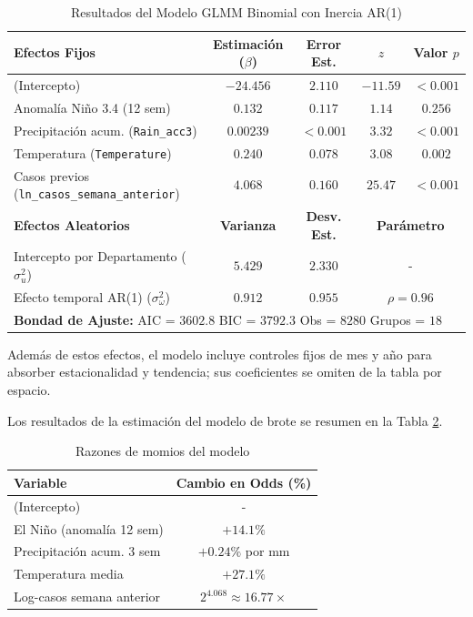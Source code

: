 \documentclass[11pt,a4paper]{article}
\begin{document}
\begin{table}[htbp]
	\centering
	\small
	\caption{Resultados del Modelo GLMM Binomial con Inercia AR(1)}
	\label{tab:modelo_completo}
	\begin{tabular}{lcccc}
		\toprule
		\textbf{Efectos Fijos} & \textbf{Estimación ($\beta$)} & \textbf{Error Est.} & \textbf{$z$} & \textbf{Valor $p$} \\
		\midrule
		(Intercepto)                        & $-24.456$ & $2.110$  & $-11.59$ & $< 0.001$ \\
		Anomalía Niño 3.4 (12 sem)          & $0.132$   & $0.117$  & $1.14$   & $0.256$   \\
		Precipitación acum. (\texttt{Rain\_acc3}) & $0.00239$ & $<0.001$ & $3.32$   & $< 0.001$ \\
		Temperatura (\texttt{Temperature})  & $0.240$   & $0.078$  & $3.08$   & $0.002$   \\
		Casos previos (\texttt{ln\_casos\_semana\_anterior}) & $4.068$ & $0.160$ & $25.47$ & $< 0.001$ \\
		\midrule
		\textbf{Efectos Aleatorios} & \textbf{Varianza} & \textbf{Desv. Est.} & \multicolumn{2}{c}{\textbf{Parámetro}} \\
		\midrule
		Intercepto por Departamento ($\sigma_u^2$) & $5.429$ & $2.330$ & \multicolumn{2}{c}{-} \\
		Efecto temporal AR(1) ($\sigma_\omega^2$) & $0.912$ & $0.955$ &
		\multicolumn{2}{c}{$\rho = 0.96$} \\
		\midrule
		\multicolumn{5}{l}{\textbf{Bondad de Ajuste:} AIC = $3602.8$ \quad BIC = $3792.3$ \quad Obs = $8280$ \quad Grupos = $18$} \\
		\bottomrule
	\end{tabular}
\end{table}

Además de estos efectos, el modelo incluye controles fijos de mes y año para absorber estacionalidad y tendencia; sus coeficientes se omiten de la tabla por espacio.

Los resultados de la estimación del modelo de brote se resumen en la Tabla \ref{tab:resultados}.

\begin{table}[H]
\centering
\caption{Razones de momios del modelo}
\label{tab:resultados}
\begin{tabular}{lc}%
\hline
Variable & Cambio en Odds (\%) \\
\hline
(Intercepto) & - \\
El Niño (anomalía 12 sem) & $+14.1\%$ \\
Precipitación acum. 3 sem & $+0.24\%$ por mm \\
Temperatura media & $+27.1\%$ \\
Log-casos semana anterior & $2^{4.068} \approx 16.77\times$ \\
\hline
\end{tabular}
\end{table}
\end{document}
